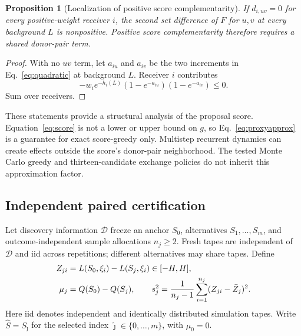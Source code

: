 \documentclass[preprint,11pt,sort&compress]{elsarticle}
\newtheorem{proposition}[theorem]{Proposition}
\begin{document}
\begin{proposition}[Localization of positive score complementarity]
\label{prop:localization}
If $d_{i,uv}=0$ for every positive-weight receiver $i$, the second set difference of $F$ for $u,v$ at every background $L$ is nonpositive. Positive score complementarity therefore requires a shared donor-pair term.
\end{proposition}
\begin{proof}
With no $uv$ term, let $a_{iu}$ and $a_{iv}$ be the two increments in Eq.~\ref{eq:quadratic} at background $L$. Receiver $i$ contributes
\[
 -w_ie^{-h_i(L)}(1-e^{-a_{iu}})(1-e^{-a_{iv}})\le0.
\]
Sum over receivers.
\end{proof}

These statements provide a structural analysis of the proposal score. Equation~\ref{eq:score} is not a lower or upper bound on $g$, so Eq.~\ref{eq:proxyapprox} is a guarantee for exact score-greedy only. Multistep recurrent dynamics can create effects outside the score's donor-pair neighborhood. The tested Monte Carlo greedy and thirteen-candidate exchange policies do not inherit this approximation factor.

\subsection{Independent paired certification}
\label{sec:certificate}
Let discovery information $\mathcal D$ freeze an anchor $S_0$, alternatives $S_1,\ldots,S_m$, and outcome-independent sample allocations $n_j\ge2$. Fresh tapes are independent of $\mathcal D$ and iid across repetitions; different alternatives may share tapes. Define
\begin{align}
 Z_{ji}&=L(S_0,\xi_i)-L(S_j,\xi_i)\in[-H,H],\notag\\
 \mu_j&=Q(S_0)-Q(S_j),\qquad
 s_j^2=\frac{1}{n_j-1}\sum_{i=1}^{n_j}(Z_{ji}-\bar Z_j)^2.
 \label{eq:paired}
\end{align}
Here iid denotes independent and identically distributed simulation tapes. Write $\widehat S=S_{\widehat\jmath}$ for the selected index $\widehat\jmath\in\{0,\ldots,m\}$, with $\mu_0=0$.
\end{document}
